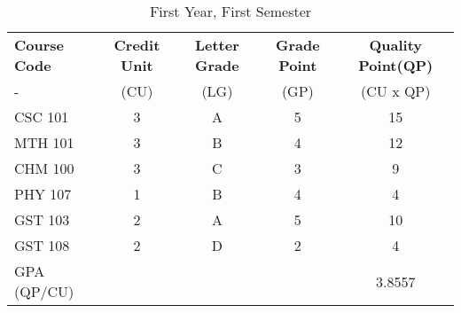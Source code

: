 \documentclass{article}
\begin{document}
	\begin{table}
		\begin{center}
			\caption{First Year, First Semester}
			\label{tab:table1}
			\begin{tabular}{|l|c|c|c|c|}
				\textbf{\cellcolor{pink!50}Course Code} & \textbf{\cellcolor{pink!50}Credit Unit} & \textbf{\cellcolor{pink!50}Letter Grade}& \textbf{\cellcolor{pink!50}Grade Point} & \textbf{\cellcolor{pink!50}Quality Point(QP)}\\
				\cellcolor{purple!10}- & \cellcolor{purple!20}(CU)&\cellcolor{purple!15}(LG) &\cellcolor{purple!20}(GP) & \cellcolor{purple!20}(CU x QP)\\
				\hline
				\cellcolor{purple!25}CSC 101 & 3 & A & 5 &15\\
				\cellcolor{purple!15}MTH 101 & 3 & B& 4 & 12\\
				\cellcolor{purple!25}CHM 100 & 3 & C & 3 &9\\
				\cellcolor{purple!15}PHY 107 & 1 & B & 4 &4\\
				\cellcolor{purple!25}GST 103 & 2 & A & 5 &10\\				\cellcolor{purple!15}GST 108 & 2 & D & 2 &4\\
				\hline
				\cellcolor{yellow!50} GPA (QP/CU) & \cellcolor{yellow!50} & \cellcolor{yellow!50} & \cellcolor{yellow!50}&  \cellcolor{yellow!50} 3.8557\\
				\hline
			\end{tabular}
		\end{center}
	\end{table}
\end{document}
